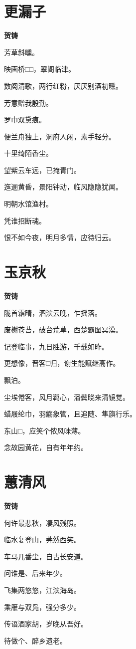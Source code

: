\documentclass[12pt,a4paper]{ctexbook}
\begin{document}
\section{更漏子}
\textbf{贺铸}\par\vspace{0.5em}
芳草斜曛。\par
映画桥□□，翠阁临津。\par
数阕清歌，两行红粉，厌厌别酒初曛。\par
芳意赠我殷勤。\par
罗巾双黛痕。\par
便兰舟独上，洞府人闲，素手轻分。\par
十里绮陌香尘。\par
望紫云车远，已掩青门。\par
迤逦黄昏，景阳钟动，临风隐隐犹闻。\par
明朝水馆渔村。\par
凭谁招断魂。\par
恨不如今夜，明月多情，应待归云。\par

\section{玉京秋}
\textbf{贺铸}\par\vspace{0.5em}
陇首霜晴，泗滨云晚，乍摇落。\par
废榭苍苔，破台荒草，西楚霸图冥漠。\par
记登临事，九日胜游，千载如昨。\par
更想像，晋客□归，谢生能赋继高作。\par
飘泊。\par
尘埃倦客，风月羁心，潘鬓晓来清镜觉。\par
蜡屐纶巾，羽觞象管，且追随、隼旟行乐。\par
东山□，应笑个侬风味薄。\par
念故园黄花，自有年年约。\par

\section{蕙清风}
\textbf{贺铸}\par\vspace{0.5em}
何许最悲秋，凄风残照。\par
临水复登山，莞然西笑。\par
车马几番尘，自古长安道。\par
问谁是、后来年少。\par
飞集两悠悠，江滨海岛。\par
乘雁与双凫，强分多少。\par
传语酒家胡，岁晚从吾好。\par
待做个、醉乡遗老。\par
\end{document}
